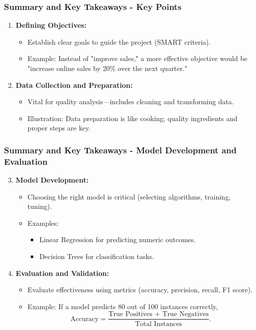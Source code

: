 \documentclass[aspectratio=169]{beamer}
\begin{document}
\begin{frame}[fragile]
    \frametitle{Summary and Key Takeaways - Key Points}
    \begin{enumerate}
        \item \textbf{Defining Objectives:}
            \begin{itemize}
                \item Establish clear goals to guide the project (SMART criteria).
                \item Example: Instead of "improve sales," a more effective objective would be "increase online sales by 20\% over the next quarter."
            \end{itemize}
        
        \item \textbf{Data Collection and Preparation:}
            \begin{itemize}
                \item Vital for quality analysis—includes cleaning and transforming data.
                \item Illustration: Data preparation is like cooking; quality ingredients and proper steps are key.
            \end{itemize}
    \end{enumerate}
\end{frame}

\begin{frame}[fragile]
    \frametitle{Summary and Key Takeaways - Model Development and Evaluation}
    \begin{enumerate}
        \setcounter{enumi}{2} %
        \item \textbf{Model Development:}
            \begin{itemize}
                \item Choosing the right model is critical (selecting algorithms, training, tuning).
                \item Examples:
                    \begin{itemize}
                        \item Linear Regression for predicting numeric outcomes.
                        \item Decision Trees for classification tasks.
                    \end{itemize}
            \end{itemize}

        \item \textbf{Evaluation and Validation:}
            \begin{itemize}
                \item Evaluate effectiveness using metrics (accuracy, precision, recall, F1 score).
                \item Example: If a model predicts 80 out of 100 instances correctly, 
                \[
                  \text{Accuracy} = \frac{\text{True Positives + True Negatives}}{\text{Total Instances}}.
                \]
            \end{itemize}
    \end{enumerate}
\end{frame}
\end{document}
